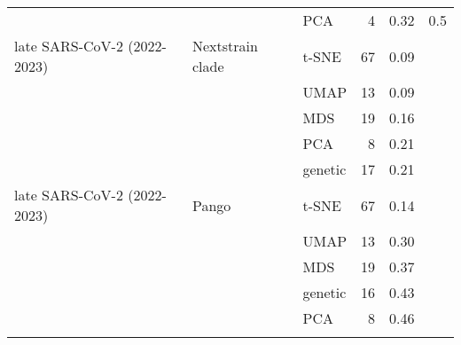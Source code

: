 \begin{tabular}{lllrrl}
                                        &                    &     PCA &               4 &                           0.32 &       0.5 \\
            late SARS-CoV-2 (2022-2023) &   Nextstrain clade &   t-SNE &              67 &                           0.09 &           \\
                                        &                    &    UMAP &              13 &                           0.09 &           \\
                                        &                    &     MDS &              19 &                           0.16 &           \\
                                        &                    &     PCA &               8 &                           0.21 &           \\
                                        &                    & genetic &              17 &                           0.21 &           \\
            late SARS-CoV-2 (2022-2023) &              Pango &   t-SNE &              67 &                           0.14 &           \\
                                        &                    &    UMAP &              13 &                           0.30 &           \\
                                        &                    &     MDS &              19 &                           0.37 &           \\
                                        &                    & genetic &              16 &                           0.43 &           \\
                                        &                    &     PCA &               8 &                           0.46 &           \\
\botrule
\end{tabular}

